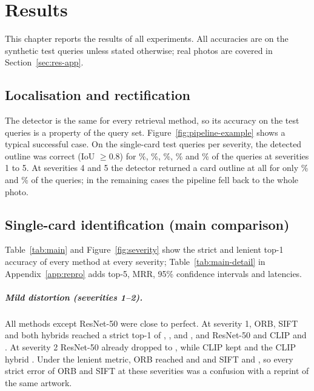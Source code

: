 \chapter{Results}
\label{ch:results}


This chapter reports the results of all experiments. All accuracies are on the synthetic test queries unless stated otherwise; real photos are covered in Section~\ref{sec:res-app}.

\section{Localisation and rectification}
\label{sec:res-rect}

The detector is the same for every retrieval method, so its accuracy on the test queries is a property of the query set. Figure~\ref{fig:pipeline-example} shows a typical successful case. On the  single-card test queries per severity, the detected outline was correct (IoU $\geq 0.8$) for \%, \%, \%, \% and \% of the queries at severities 1 to 5. At severities 4 and 5 the detector returned a card outline at all for only \% and \% of the queries; in the remaining cases the pipeline fell back to the whole photo.



\section{Single-card identification (main comparison)}
\label{sec:res-main}

Table~\ref{tab:main} and Figure~\ref{fig:severity} show the strict and lenient top-1 accuracy of every method at every severity; Table~\ref{tab:main-detail} in Appendix~\ref{app:repro} adds top-5, MRR, 95\% confidence intervals and latencies.




\paragraph{Mild distortion (severities 1--2).} All methods except ResNet-50 were close to perfect. At severity 1, ORB, SIFT and both hybrids reached a strict top-1 of , ,  and , and ResNet-50 and CLIP  and . At severity 2 ResNet-50 already dropped to , while CLIP kept  and the CLIP hybrid . Under the lenient metric, ORB reached  and  and SIFT  and , so every strict error of ORB and SIFT at these severities was a confusion with a reprint of the same artwork.


